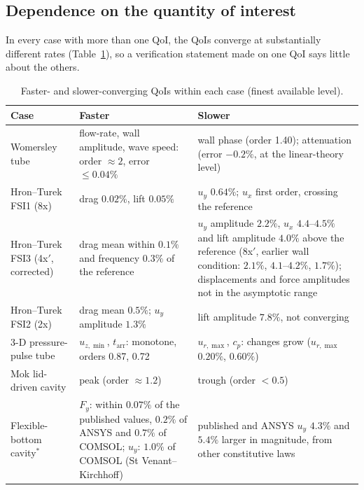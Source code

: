 \subsection{Dependence on the quantity of interest}\label{sec:qoi_dependence}

In every case with more than one QoI, the QoIs converge at substantially different rates (Table~\ref{tab:qoi_dependence}), so a verification statement made on one QoI says little about the others.

\begin{table}[htbp]
	\centering
	\footnotesize
	\setlength{\tabcolsep}{3pt}
	\caption{Faster- and slower-converging QoIs within each case (finest available level).}
	\label{tab:qoi_dependence}
	\begin{tabular}{p{2.8cm}p{5.4cm}p{5.4cm}}
		\toprule
		Case & Faster & Slower \\
		\midrule
		Womersley tube & flow-rate, wall amplitude, wave speed: order $\approx2$, error $\leq0.04\%$ & wall phase (order 1.40); attenuation (error $-0.2\%$, at the linear-theory level) \\
		Hron--Turek FSI1 (8x) & drag $0.02\%$, lift $0.05\%$ & $u_y$ $0.64\%$; $u_x$ first order, crossing the reference \\
		Hron--Turek FSI3 (4x$'$, corrected) & drag mean within $0.1\%$ and frequency $0.3\%$ of the reference & $u_y$ amplitude $2.2\%$, $u_x$ $4.4$--$4.5\%$ and lift amplitude $4.0\%$ above the reference (8x$'$, earlier wall condition: $2.1\%$, $4.1$--$4.2\%$, $1.7\%$); displacements and force amplitudes not in the asymptotic range \\
		Hron--Turek FSI2 (2x) & drag mean $0.5\%$; $u_y$ amplitude $1.3\%$ & lift amplitude $7.8\%$, not converging \\
		3-D pressure-pulse tube & $u_{z,\min}$, $t_\mathrm{arr}$: monotone, orders 0.87, 0.72 & $u_{r,\max}$, $c_p$: changes grow ($u_{r,\max}$ $0.20\%$, $0.60\%$) \\
		Mok lid-driven cavity & peak (order $\approx1.2$) & trough (order $<0.5$) \\
		Flexible-bottom cavity$^\ast$ & $F_y$: within $0.07\%$ of the published values, $0.2\%$ of ANSYS and $0.7\%$ of COMSOL; $u_y$: $1.0\%$ of COMSOL (St Venant--Kirchhoff) & published and ANSYS $u_y$ $4.3\%$ and $5.4\%$ larger in magnitude, from other constitutive laws \\
				\bottomrule
	\end{tabular}
\end{table}


